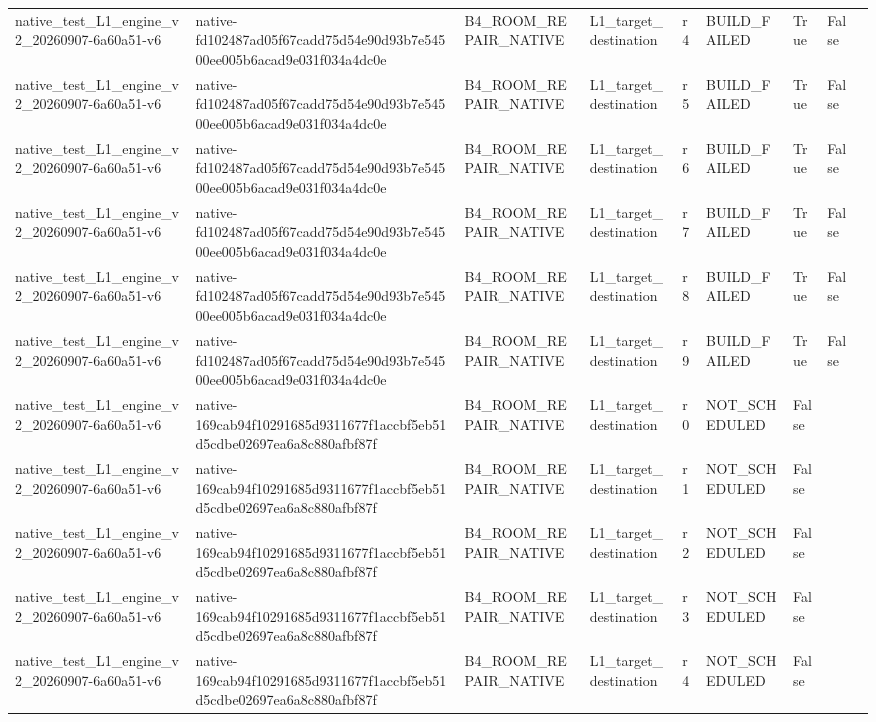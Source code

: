 \begin{tabular}{lllllllll}
native\_test\_L1\_engine\_v2\_20260907-6a60a51-v6 & native-fd102487ad05f67cadd75d54e90d93b7e54500ee005b6acad9e031f034a4dc0e & B4\_ROOM\_REPAIR\_NATIVE & L1\_target\_destination & r4 & BUILD\_FAILED & True & False &  \\
native\_test\_L1\_engine\_v2\_20260907-6a60a51-v6 & native-fd102487ad05f67cadd75d54e90d93b7e54500ee005b6acad9e031f034a4dc0e & B4\_ROOM\_REPAIR\_NATIVE & L1\_target\_destination & r5 & BUILD\_FAILED & True & False &  \\
native\_test\_L1\_engine\_v2\_20260907-6a60a51-v6 & native-fd102487ad05f67cadd75d54e90d93b7e54500ee005b6acad9e031f034a4dc0e & B4\_ROOM\_REPAIR\_NATIVE & L1\_target\_destination & r6 & BUILD\_FAILED & True & False &  \\
native\_test\_L1\_engine\_v2\_20260907-6a60a51-v6 & native-fd102487ad05f67cadd75d54e90d93b7e54500ee005b6acad9e031f034a4dc0e & B4\_ROOM\_REPAIR\_NATIVE & L1\_target\_destination & r7 & BUILD\_FAILED & True & False &  \\
native\_test\_L1\_engine\_v2\_20260907-6a60a51-v6 & native-fd102487ad05f67cadd75d54e90d93b7e54500ee005b6acad9e031f034a4dc0e & B4\_ROOM\_REPAIR\_NATIVE & L1\_target\_destination & r8 & BUILD\_FAILED & True & False &  \\
native\_test\_L1\_engine\_v2\_20260907-6a60a51-v6 & native-fd102487ad05f67cadd75d54e90d93b7e54500ee005b6acad9e031f034a4dc0e & B4\_ROOM\_REPAIR\_NATIVE & L1\_target\_destination & r9 & BUILD\_FAILED & True & False &  \\
native\_test\_L1\_engine\_v2\_20260907-6a60a51-v6 & native-169cab94f10291685d9311677f1accbf5eb51d5cdbe02697ea6a8c880afbf87f & B4\_ROOM\_REPAIR\_NATIVE & L1\_target\_destination & r0 & NOT\_SCHEDULED & False &  &  \\
native\_test\_L1\_engine\_v2\_20260907-6a60a51-v6 & native-169cab94f10291685d9311677f1accbf5eb51d5cdbe02697ea6a8c880afbf87f & B4\_ROOM\_REPAIR\_NATIVE & L1\_target\_destination & r1 & NOT\_SCHEDULED & False &  &  \\
native\_test\_L1\_engine\_v2\_20260907-6a60a51-v6 & native-169cab94f10291685d9311677f1accbf5eb51d5cdbe02697ea6a8c880afbf87f & B4\_ROOM\_REPAIR\_NATIVE & L1\_target\_destination & r2 & NOT\_SCHEDULED & False &  &  \\
native\_test\_L1\_engine\_v2\_20260907-6a60a51-v6 & native-169cab94f10291685d9311677f1accbf5eb51d5cdbe02697ea6a8c880afbf87f & B4\_ROOM\_REPAIR\_NATIVE & L1\_target\_destination & r3 & NOT\_SCHEDULED & False &  &  \\
native\_test\_L1\_engine\_v2\_20260907-6a60a51-v6 & native-169cab94f10291685d9311677f1accbf5eb51d5cdbe02697ea6a8c880afbf87f & B4\_ROOM\_REPAIR\_NATIVE & L1\_target\_destination & r4 & NOT\_SCHEDULED & False &  &  \\

\end{tabular}
